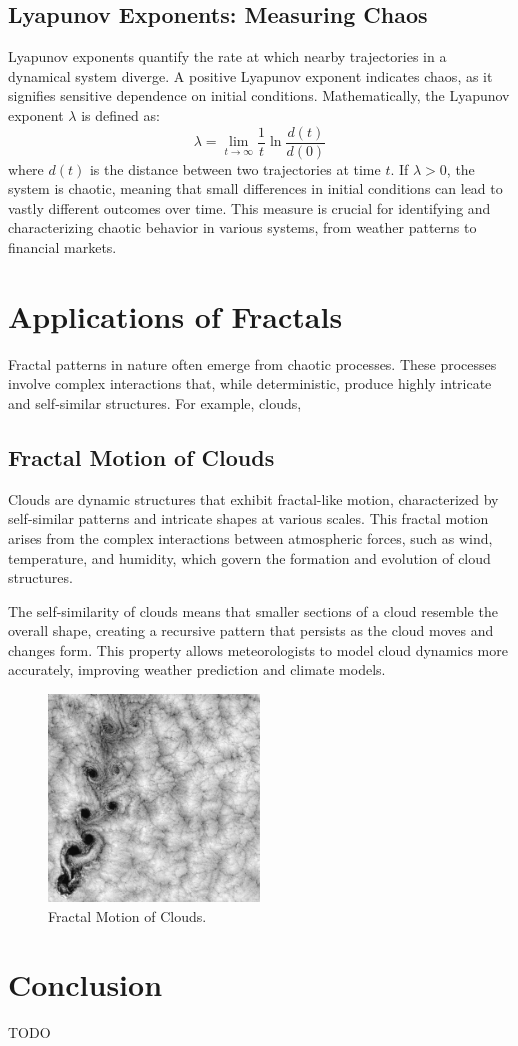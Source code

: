 \documentclass[12pt]{article}
\begin{document}
\subsection{Lyapunov Exponents: Measuring Chaos}
Lyapunov exponents quantify the rate at which nearby trajectories in a dynamical system diverge. A positive Lyapunov exponent indicates chaos, as it signifies sensitive dependence on initial conditions. Mathematically, the Lyapunov exponent \( \lambda \) is defined as:
\[
\lambda = \lim_{t \to \infty} \frac{1}{t} \ln \frac{d(t)}{d(0)}
\]
where \( d(t) \) is the distance between two trajectories at time \( t \). If \( \lambda > 0 \), the system is chaotic, meaning that small differences in initial conditions can lead to vastly different outcomes over time. This measure is crucial for identifying and characterizing chaotic behavior in various systems, from weather patterns to financial markets.

\section{Applications of Fractals}
Fractal patterns in nature often emerge from chaotic processes. These processes involve complex interactions that, while deterministic, produce highly intricate and self-similar structures. For example, clouds, 

\subsection{Fractal Motion of Clouds}
Clouds are dynamic structures that exhibit fractal-like motion, characterized by self-similar patterns and intricate shapes at various scales. This fractal motion arises from the complex interactions between atmospheric forces, such as wind, temperature, and humidity, which govern the formation and evolution of cloud structures.

The self-similarity of clouds means that smaller sections of a cloud resemble the overall shape, creating a recursive pattern that persists as the cloud moves and changes form. This property allows meteorologists to model cloud dynamics more accurately, improving weather prediction and climate models.

\begin{figure}[h]
\centering
\includegraphics[width=0.5\textwidth]{assets/fractal-clouds.jpg}
\caption{Fractal Motion of Clouds.}
\label{fig:fractal-clouds}
\end{figure}




\section{Conclusion}
TODO



\nocite{*} 
 

\end{document}
